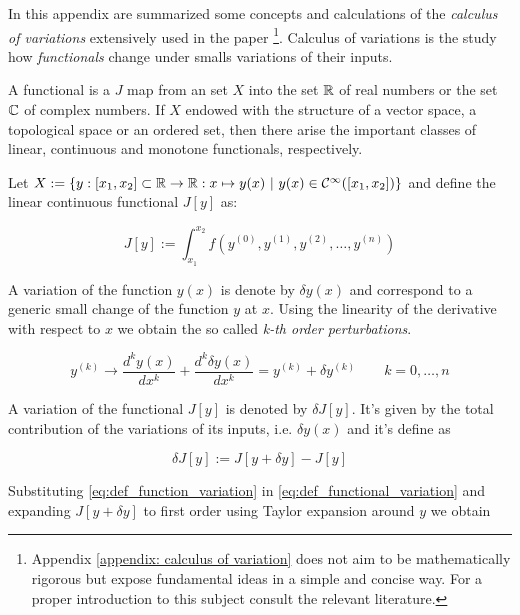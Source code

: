 In this appendix are summarized some concepts and calculations of the
\emph{calculus of variations} extensively used in the paper
\footnote{
  Appendix \ref{appendix: calculus of variation} does not aim to be
  mathematically rigorous but expose fundamental ideas in a simple and concise
  way. For a proper introduction to this subject consult the relevant
  literature.
}.
Calculus of variations is the study how \emph{functionals} change under smalls
variations of their inputs.

\begin{definition}
  \cite{Functional_Encyclopedia_of_Mathematics}
  A functional is a $J$ map from an set $X$ into the set $\operatorname{\mathbb{R}}$ of real numbers or
  the set $\operatorname{\mathbb{C}}$ of complex numbers. If $X$ endowed with the structure of a vector
  space, a topological space or an ordered set, then there arise the important
  classes of linear, continuous and monotone functionals, respectively.
\end{definition}

Let $X:=\{y: [x_1, x_2] \subset \operatorname{\mathbb{R}} \rightarrow \operatorname{\mathbb{R}}: x \mapsto y(x) \ | \ y(x)
\in \mathcal{C}^{\infty}([x_1, x_2])\}$ and define the linear continuous
functional $J[y]$ as:

\begin{equation} \label{eq:def_functional}
  J[y] := \int_{x_1}^{x_2} f(y^{(0)}, y^{(1)}, y^{(2)}, \ldots, y^{(n)})
\end{equation}

A variation of the function $y(x)$ is denote by $\delta y(x)$ and correspond to
a generic small change of the function $y$ at $x$. Using the linearity of the
derivative with respect to $x$ we obtain the so called \emph{k-th order
perturbations}.

\begin{equation} \label{eq:def_function_variation}
  y^{(k)} \rightarrow \frac{d^ky(x)}{dx^k} + \frac{d^k\delta y(x)}{dx^k} =
  y^{(k)} + \delta y^{(k)} \qquad k=0, \ldots, n
\end{equation}

A variation of the functional $J[y]$ is denoted by $\delta J[y]$. It's given by
the total contribution of the variations of its inputs, i.e. $\delta y(x)$ and
it's define as

\begin{equation} \label{eq:def_functional_variation}
  \delta J[y] := J[y + \delta y] - J[y]
\end{equation}

Substituting \eqref{eq:def_function_variation} in
\eqref{eq:def_functional_variation} and expanding $J[y + \delta y]$ to first
order using Taylor expansion around $y$ we obtain


